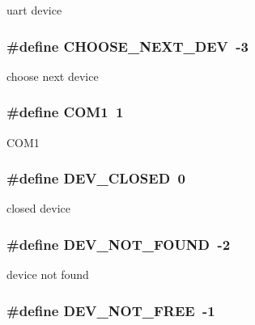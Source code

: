uart device \hypertarget{group___a_p7000___d_e_v_g806716f897cab5cd19b55deb3ba7c53b}{
\subsubsection[{CHOOSE\_\-NEXT\_\-DEV}]{\setlength{\rightskip}{0pt plus 5cm}\#define CHOOSE\_\-NEXT\_\-DEV~-3}}
\label{group___a_p7000___d_e_v_g806716f897cab5cd19b55deb3ba7c53b}


choose next device \hypertarget{group___a_p7000___d_e_v_g00dbb3ab1c59e14699be9393693e2248}{
\subsubsection[{COM1}]{\setlength{\rightskip}{0pt plus 5cm}\#define COM1~1}}
\label{group___a_p7000___d_e_v_g00dbb3ab1c59e14699be9393693e2248}


COM1 \hypertarget{group___a_p7000___d_e_v_gcc57cb6b21940d6081f11ccda4a6edeb}{
\subsubsection[{DEV\_\-CLOSED}]{\setlength{\rightskip}{0pt plus 5cm}\#define DEV\_\-CLOSED~0}}
\label{group___a_p7000___d_e_v_gcc57cb6b21940d6081f11ccda4a6edeb}


closed device \hypertarget{group___a_p7000___d_e_v_geb725262e4a6b9035c8194b0fb3dee69}{
\subsubsection[{DEV\_\-NOT\_\-FOUND}]{\setlength{\rightskip}{0pt plus 5cm}\#define DEV\_\-NOT\_\-FOUND~-2}}
\label{group___a_p7000___d_e_v_geb725262e4a6b9035c8194b0fb3dee69}


device not found \hypertarget{group___a_p7000___d_e_v_g1efcb51e9cd98aa0cf1f968a98330cd2}{
\subsubsection[{DEV\_\-NOT\_\-FREE}]{\setlength{\rightskip}{0pt plus 5cm}\#define DEV\_\-NOT\_\-FREE~-1}}
\label{group___a_p7000___d_e_v_g1efcb51e9cd98aa0cf1f968a98330cd2}


